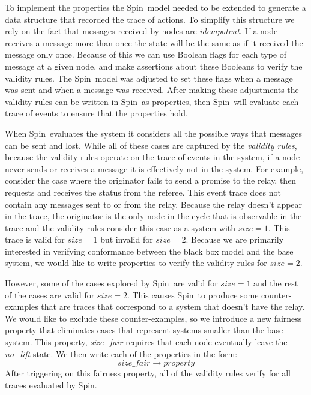 \documentclass[runningheads]{llncs}
\newcommand{\spin}{Spin}
\newif\ifcomments
\newif\ifkylecomments
\newcommand{\egm}[1]{\ifcomments\textcolor{orange}{egm: #1}\fi}
\newcommand{\krs}[1]{\ifkylecomments\textcolor{blue}{krs: #1}\fi}
\begin{document}
To implement the properties the \spin\ model needed to be extended to generate a data structure that recorded the trace of actions. To simplify this structure we rely on the fact that messages received by nodes are \emph{idempotent}. If a node receives a message more than once the state will be the same as if it received the message only once. Because of this we can use Boolean flags for each type of message at a given node, and make assertions about these Booleans to verify the validity rules. The \spin\ model was adjusted to set these flags when a message was sent and when a message was received. 
After making these adjustments the validity rules can be written in \spin\ as properties, then \spin\ will evaluate each trace of events to ensure that the properties hold. 

When \spin\ evaluates the system it considers all the possible ways that messages can be sent and lost. While all of these cases are captured by the \emph{validity rules}, because the validity rules operate on the trace of events in the system, if a node never sends or receives a message it is effectively not in the system. 
For example, consider the case where the originator fails to send a promise to the relay, then requests and receives the status from the referee. This event trace does not contain any messages sent to or from the relay. Because the relay doesn't appear in the trace, the originator is the only node in the cycle that is observable in the trace and the validity rules consider this case as a system with $size=1$. This trace is valid for $size=1$ but invalid for $size=2$. Because we are primarily interested in verifying conformance between the black box model and the base system, we would like to write properties to verify the validity rules for $size=2$. 
\krs{Is that better? \egm{What is size in this context? Our base system has as single relay. How does that relate to size two? Also, The discussion about cases that are valid for different sizes is confusing. An example would really help the reader.}}

However, some of the cases explored by \spin\ are valid for $size=1$ and the rest of the cases are valid for $size=2$.
This causes \spin\ to produce some counter-examples that are traces that correspond to a system that doesn't have the relay. We would like to exclude these counter-examples, so we introduce a new fairness property that eliminates cases that represent systems smaller than the base system. This property, \emph{size\_fair} requires that each node eventually leave the \emph{no\_lift} state. We then write each of the properties in the form:
$$size\_fair \longrightarrow property$$
After triggering on this fairness property, all of the validity rules verify for all traces evaluated by \spin. 
\end{document}
